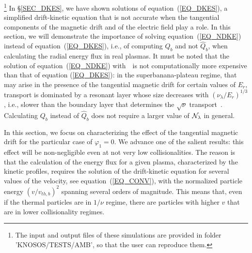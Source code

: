 
\footnote{The input and output files of these simulations are provided in folder 'KNOSOS/TESTS/AMB', so that the user can reproduce them.} In \S\ref{SEC_DKES}, we have shown solutions of equation~(\ref{EQ_DKES}), a simplified drift-kinetic equation that is not accurate when the tangential components of the magnetic drift and of the electric field play a role. In this section, we will demonstrate the importance of solving equation~(\ref{EQ_NDKE}) instead of equation~(\ref{EQ_DKES}), i.e., of computing $Q_b$ and not $\hat Q_b$, when calculating the radial energy flux in real plasmas. It must be noted that the solution of equation~(\ref{EQ_NDKE}) with~\KNOSOS~is not computationally more expensive than that of equation (\ref{EQ_DKES}): in the superbanana-plateau regime, that may arise in the presence of the tangential magnetic drift for certain values of $E_r$, transport is dominated by a resonant layer whose size decreases with $(\nu_\lambda/E_r)^{1/3}$, i.e., slower than the boundary layer that determines the $\sqrt{\nu}$ transport~\citep{calvo2017sqrtnu}. Calculating $Q_b$ instead of $\hat Q_b$ does not require a larger value of ${\cal{N}}_\lambda$ in general.

In this section, we focus on characterizing the effect of the tangential magnetic drift for the particular case of $\varphi_1=0$. We advance one of the salient results: this effect will be non-negligible even at not very low collisionalities. The reason is that the calculation of the energy flux for a given plasma, characterized by the kinetic profiles, requires the solution of the drift-kinetic equation for several values of the velocity, see equation~(\ref{EQ_CONV}), with the normalized particle energy $(v/v_{th,b})^2$ spanning several orders of magnitude. This means that, even if the thermal particles are in $1/\nu$ regime, there are particles with higher $v$ that are in lower collisionality regimes. 

